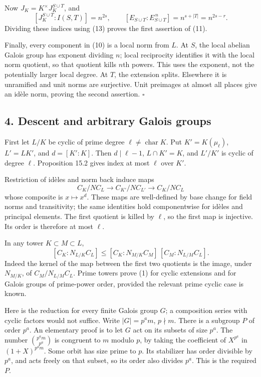 \documentclass[11pt,a4paper]{article}
\begin{document}
Now \(J_K=K^\times J_K^{S\cup T}\), and \[
[J_K^{S\cup T}:I(S,T)]=n^{2s},\qquad
[E_{S\cup T}:E_{S\cup T}^{\,n}]=n^{s+|T|}=n^{2s-r}.
\] Dividing these indices using (13) proves the first assertion of (11).

Finally, every component in (10) is a local norm from \(L\). At \(S\),
the local abelian Galois group has exponent dividing \(n\); local
reciprocity identifies it with the local norm quotient, so that quotient
kills \(n\)th powers. This uses the exponent, not the potentially larger
local degree. At \(T\), the extension splits. Elsewhere it is unramified
and unit norms are surjective. Unit preimages at almost all places give
an idèle norm, proving the second assertion. \(\square\)

\subsection{4. Descent and arbitrary Galois
groups}\label{descent-and-arbitrary-galois-groups}

First let \(L/K\) be cyclic of prime degree
\(\ell\ne\operatorname{char}K\). Put \(K'=K(\mu_\ell)\), \(L'=LK'\), and
\(d=[K':K]\). Then \(d\mid\ell-1\), \(L\cap K'=K\), and \(L'/K'\) is
cyclic of degree \(\ell\). Proposition 15.2 gives index at most \(\ell\)
over \(K'\).

Restriction of idèles and norm back induce maps \[
C_K/NC_L\longrightarrow C_{K'}/NC_{L'}
\longrightarrow C_K/NC_L
\tag{14}
\] whose composite is \(x\mapsto x^d\). These maps are well-defined by
base change for field norms and transitivity; the same identities hold
componentwise for idèles and principal elements. The first quotient is
killed by \(\ell\), so the first map is injective. Its order is
therefore at most \(\ell\).

In any tower \(K\subset M\subset L\), \[
[C_K:N_{L/K}C_L]\leq
[C_K:N_{M/K}C_M]\,[C_M:N_{L/M}C_L].
\tag{15}
\] Indeed the kernel of the map between the first two quotients is the
image, under \(N_{M/K}\), of \(C_M/N_{L/M}C_L\). Prime towers prove (1)
for cyclic extensions and for Galois groups of prime-power order,
provided the relevant prime cyclic case is known.

Here is the reduction for every finite Galois group \(G\); a composition
series with cyclic factors would not suffice. Write \(|G|=p^a m\),
\(p\nmid m\). There is a subgroup \(P\) of order \(p^a\). An elementary
proof is to let \(G\) act on its subsets of size \(p^a\). The number
\(\binom{p^a m}{p^a}\) is congruent to \(m\) modulo \(p\), by taking the
coefficient of \(X^{p^a}\) in \((1+X)^{p^a m}\). Some orbit has size
prime to \(p\). Its stabilizer has order divisible by \(p^a\), and acts
freely on that subset, so its order also divides \(p^a\). This is the
required \(P\).
\end{document}
